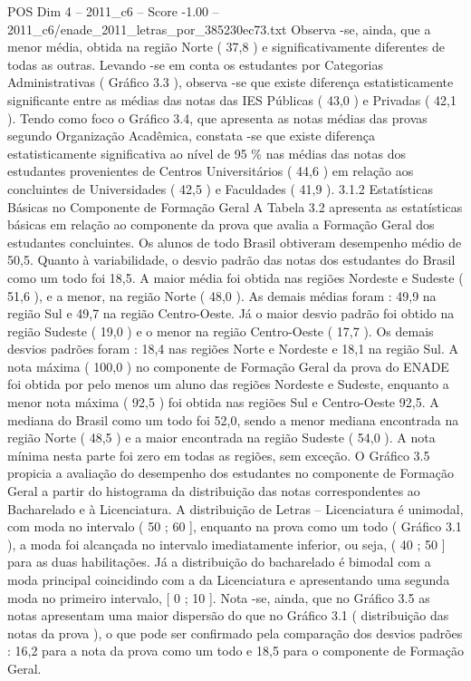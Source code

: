 \begin{textsample}{POS Dim 4 – 2011\_c6 – Score -1.00 – 2011\_c6/enade\_2011\_letras\_por\_385230ec73.txt}
Observa -se, ainda, que a menor média, obtida na região Norte ( 37,8 ) e significativamente diferentes de todas as outras.
Levando -se em conta os estudantes por Categorias Administrativas ( Gráfico 3.3 ), observa -se que existe diferença estatisticamente significante entre as médias das notas das IES Públicas ( 43,0 ) e Privadas ( 42,1 ).
Tendo como foco o Gráfico 3.4, que apresenta as notas médias das provas segundo Organização Acadêmica, constata -se que existe diferença estatisticamente significativa ao nível de 95 \% nas médias das notas dos estudantes provenientes de Centros Universitários ( 44,6 ) em relação aos concluintes de Universidades ( 42,5 ) e Faculdades ( 41,9 ). 3.1.2 Estatísticas Básicas no Componente de Formação Geral A Tabela 3.2 apresenta as estatísticas básicas em relação ao componente da prova que avalia a Formação Geral dos estudantes concluintes.
Os alunos de todo Brasil obtiveram desempenho médio de 50,5.
Quanto à variabilidade, o desvio padrão das notas dos estudantes do Brasil como um todo foi 18,5.
A maior média foi obtida nas regiões Nordeste e Sudeste ( 51,6 ), e a menor, na região Norte ( 48,0 ).
As demais médias foram : 49,9 na região Sul e 49,7 na região Centro-Oeste.
Já o maior desvio padrão foi obtido na região Sudeste ( 19,0 ) e o menor na região Centro-Oeste ( 17,7 ).
Os demais desvios padrões foram : 18,4 nas regiões Norte e Nordeste e 18,1 na região Sul.
A nota máxima ( 100,0 ) no componente de Formação Geral da prova do ENADE foi obtida por pelo menos um aluno das regiões Nordeste e Sudeste, enquanto a menor nota máxima ( 92,5 ) foi obtida nas regiões Sul e Centro-Oeste 92,5.
A mediana do Brasil como um todo foi 52,0, sendo a menor mediana encontrada na região Norte ( 48,5 ) e a maior encontrada na região Sudeste ( 54,0 ).
A nota mínima nesta parte foi zero em todas as regiões, sem exceção.
O Gráfico 3.5 propicia a avaliação do desempenho dos estudantes no componente de Formação Geral a partir do histograma da distribuição das notas correspondentes ao Bacharelado e à Licenciatura.
A distribuição de Letras – Licenciatura é unimodal, com moda no intervalo ( 50 ; 60 ], enquanto na prova como um todo ( Gráfico 3.1 ), a moda foi alcançada no intervalo imediatamente inferior, ou seja, ( 40 ; 50 ] para as duas habilitações.
Já a distribuição do bacharelado é bimodal com a moda principal coincidindo com a da Licenciatura e apresentando uma segunda moda no primeiro intervalo, [ 0 ; 10 ].
Nota -se, ainda, que no Gráfico 3.5 as notas apresentam uma maior dispersão do que no Gráfico 3.1 ( distribuição das notas da prova ), o que pode ser confirmado pela comparação dos desvios padrões : 16,2 para a nota da prova como um todo e 18,5 para o componente de Formação Geral.

\end{textsample}
